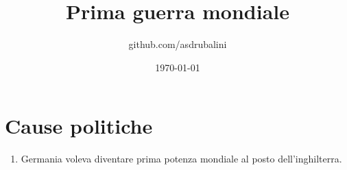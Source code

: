 \documentclass{article}
\title{Prima guerra mondiale}
\author{github.com/asdrubalini}
\date{\today}
\begin{document}
    \maketitle

    \section{Cause politiche}
    \begin{enumerate}
        \item Germania voleva diventare prima potenza mondiale al posto dell'inghilterra.
    \end{enumerate}
\end{document}
